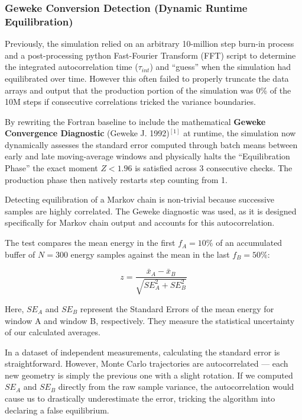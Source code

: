 \documentclass[
]{article}
\begin{document}
\subsubsection{Geweke Conversion Detection (Dynamic Runtime
Equilibration)}\label{geweke-conversion-detection-dynamic-runtime-equilibration}

Previously, the simulation relied on an arbitrary 10-million step
burn-in process and a post-processing python Fast-Fourier Transform
(FFT) script to determine the integrated autocorrelation time
(\(\tau_{int}\)) and ``guess'' when the simulation had equilibrated over
time. However this often failed to properly truncate the data arrays and
output that the production portion of the simulation was 0\% of the 10M
steps if consecutive correlations tricked the variance boundaries.

By rewriting the Fortran baseline to include the mathematical
\textbf{Geweke Convergence Diagnostic} (Geweke J. 1992)\(^[1]\) at
runtime, the simulation now dynamically assesses the standard error
computed through batch means between early and late moving-average
windows and physically halts the ``Equilibration Phase'' the exact
moment \(Z < 1.96\) is satisfied across 3 consecutive checks. The
production phase then natively restarts step counting from 1.

Detecting equilibration of a Markov chain is non-trivial because
successive samples are highly correlated. The Geweke diagnostic was
used, as it is designed specifically for Markov chain output and
accounts for this autocorrelation.

The test compares the mean energy in the first \(f_A = 10\%\) of an
accumulated buffer of \(N = 300\) energy samples against the mean in the
last \(f_B = 50\%\):

\[z = \frac{\bar{x}_A - \bar{x}_B}{\sqrt{SE_A^2 + SE_B^2}}\]

Here, \(SE_A\) and \(SE_B\) represent the Standard Errors of the mean
energy for window A and window B, respectively. They measure the
statistical uncertainty of our calculated averages.

In a dataset of independent measurements, calculating the standard error
is straightforward. However, Monte Carlo trajectories are autocorrelated
--- each new geometry is simply the previous one with a slight rotation.
If we computed \(SE_A\) and \(SE_B\) directly from the raw sample
variance, the autocorrelation would cause us to drastically
underestimate the error, tricking the algorithm into declaring a false
equilibrium.
\end{document}
